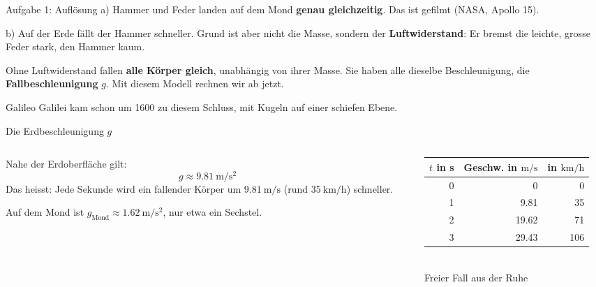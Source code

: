 \documentclass[14pt,aspectratio=169]{beamer}
\begin{document}
\begin{frame}{Aufgabe 1: Auflösung}
  \small
  a) Hammer und Feder landen auf dem Mond \textbf{genau gleichzeitig}.
  Das ist gefilmt (NASA, Apollo 15).

  \vspace{0.3em}
  b) Auf der Erde fällt der Hammer schneller. Grund ist aber nicht die
  Masse, sondern der \textbf{Luftwiderstand}: Er bremst die leichte,
  grosse Feder stark, den Hammer kaum.

  \vspace{0.4em}
  \begin{merkbox}
    Ohne Luftwiderstand fallen \textbf{alle Körper gleich}, unabhängig
    von ihrer Masse. Sie haben alle dieselbe Beschleunigung, die
    \textbf{Fallbeschleunigung} $g$. Mit diesem Modell rechnen wir ab
    jetzt.
  \end{merkbox}
  \footnotesize
  Galileo Galilei kam schon um 1600 zu diesem Schluss, mit Kugeln auf einer
  schiefen Ebene.
\end{frame}

\begin{frame}{Die Erdbeschleunigung $g$}
  \small
  \begin{columns}[T]
    \begin{column}{0.5\textwidth}
      Nahe der Erdoberfläche gilt:
      \[
        g\approx\SI{9.81}{\meter\per\second\squared}
      \]
      Das heisst: Jede Sekunde wird ein fallender Körper um
      $\SI{9.81}{\meter\per\second}$ (rund $\SI{35}{\kilo\meter\per\hour}$)
      schneller.

      \vspace{0.4em}
      Auf dem Mond ist
      $g_{\text{Mond}}\approx\SI{1.62}{\meter\per\second\squared}$, nur
      etwa ein Sechstel.
    \end{column}
    \begin{column}{0.46\textwidth}
      \centering
      \begin{tabular}{rrr}
        \toprule
        $t$ in s & Geschw. in $\si{\meter\per\second}$ & in $\si{\kilo\meter\per\hour}$ \\
        \midrule
        0 & 0\phantom{.00} & 0 \\
        1 & 9.81 & 35 \\
        2 & 19.62 & 71 \\
        3 & 29.43 & 106 \\
        \bottomrule
      \end{tabular}\\[0.4em]
      \footnotesize Freier Fall aus der Ruhe
    \end{column}
  \end{columns}
\end{frame}
\end{document}
